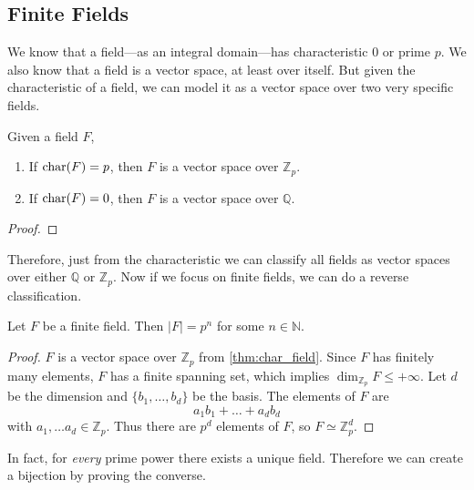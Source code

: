 \subsection{Finite Fields} 

  We know that a field---as an integral domain---has characteristic $0$ or prime $p$. We also know that a field is a vector space, at least over itself. But given the characteristic of a field, we can model it as a vector space over two very specific fields. 

  \begin{theorem}
    \label{thm:char_field}
    Given a field $F$, 
    \begin{enumerate}
      \item If $\operatorname{char}(F) = p$, then $F$ is a vector space over $\mathbb{Z}_p$. 
      \item If $\operatorname{char}(F) = 0$, then $F$ is a vector space over $\mathbb{Q}$. 
    \end{enumerate}
  \end{theorem}
  \begin{proof}
    
  \end{proof} 

  Therefore, just from the characteristic we can classify all fields as vector spaces over either $\mathbb{Q}$ or $\mathbb{Z}_p$. Now if we focus on finite fields, we can do a reverse classification. 

  \begin{theorem}
    Let $F$ be a finite field. Then $|F| = p^n$ for some $n \in \mathbb{N}$. 
  \end{theorem}
  \begin{proof}
    $F$ is a vector space over $\mathbb{Z}_p$ from \ref{thm:char_field}. Since $F$ has finitely many elements, $F$ has a finite spanning set, which implies $\dim_{\mathbb{Z}_p} F \leq + \infty$. Let $d$ be the dimension and $\{b_1, \ldots, b_d\}$ be the basis. The elements of $F$ are 
    \begin{equation}
      a_1 b_1 + \ldots + a_d b_d
    \end{equation}
    with $a_1, \ldots a_d \in \mathbb{Z}_p$. Thus there are $p^d$ elements of $F$, so $F \simeq \mathbb{Z}_p^d$. 
  \end{proof}

  In fact, for \textit{every} prime power there exists a unique field. Therefore we can create a bijection by proving the converse. 

